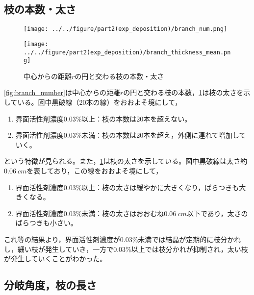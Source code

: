 \documentclass[autodetect-engine,dvi=dvipdfmx,a4paper,ja=standard,oneside,openany,11pt,draft]{bxjsbook}
\begin{document}
\subsection{枝の本数・太さ}
\begin{figure}[H]
  \begin{minipage}
    {0.45\textwidth}
    \centering
    \texttt{[image: ../../figure/part2(exp\_deposition)/branch\_num.png]}
    \label{fig:branch_number}
  \end{minipage}
  \begin{minipage}
    {0.45\textwidth}
    \centering
    \texttt{[image: ../../figure/part2(exp\_deposition)/branch\_thickness\_mean.png]}
    \label{fig:branch_thickness}
  \end{minipage}
  \caption{中心からの距離$r$の円と交わる枝の本数・太さ}
\end{figure}
\ref{fig:branch_number}は中心からの距離$r$の円と交わる枝の本数，\ref{fig:branch_thickness}は枝の太さを示している。図中黒破線（20本の線）をおおよそ境にして，
\begin{enumerate}
  \item 界面活性剤濃度0.03\%以上：枝の本数は20本を超えない。
  \item 界面活性剤濃度0.03\%未満：枝の本数は20本を超え，外側に連れて増加していく。
\end{enumerate}
という特徴が見られる。また，\ref{fig:branch_thickness}は枝の太さを示している。図中黒破線は太さ約$\SI{0.06}{cm}$を表しており，この線をおおよそ境にして，
\begin{enumerate}
  \item 界面活性剤濃度0.03\%以上：枝の太さは緩やかに大きくなり，ばらつきも大きくなる。
  \item 界面活性剤濃度0.03\%未満：枝の太さはおおむね$\SI{0.06}{cm}$以下であり，太さのばらつきも小さい。
\end{enumerate}
これ等の結果より，界面活性剤濃度が0.03\%未満では結晶が定期的に枝分かれし，細い枝が発生していき，一方で0.03\%以上では枝分かれが抑制され，太い枝が発生していくことがわかった。
\subsection{分岐角度，枝の長さ}
\end{document}
